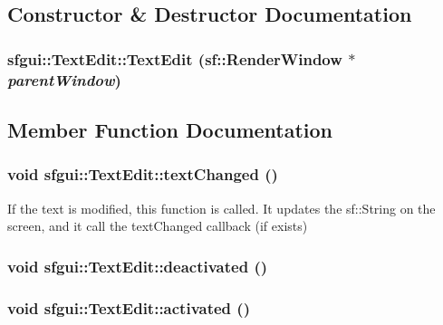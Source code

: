 \subsection{Constructor \& Destructor Documentation}
\hypertarget{classsfgui_1_1TextEdit_c6f2d938ccf876f05a9a9c47060c6093}{
\subsubsection[TextEdit]{\setlength{\rightskip}{0pt plus 5cm}sfgui::TextEdit::TextEdit (sf::RenderWindow $\ast$ {\em parentWindow})}}
\label{classsfgui_1_1TextEdit_c6f2d938ccf876f05a9a9c47060c6093}




\subsection{Member Function Documentation}
\hypertarget{classsfgui_1_1TextEdit_04bf790d96e0014479cc791691ecbade}{
\subsubsection[textChanged]{\setlength{\rightskip}{0pt plus 5cm}void sfgui::TextEdit::textChanged ()}}
\label{classsfgui_1_1TextEdit_04bf790d96e0014479cc791691ecbade}




If the text is modified, this function is called. It updates the sf::String on the screen, and it call the textChanged callback (if exists) \hypertarget{classsfgui_1_1TextEdit_c5ff761e3933294b46892db32e62b9f6}{
\subsubsection[deactivated]{\setlength{\rightskip}{0pt plus 5cm}void sfgui::TextEdit::deactivated ()}}
\label{classsfgui_1_1TextEdit_c5ff761e3933294b46892db32e62b9f6}


\hypertarget{classsfgui_1_1TextEdit_c009c601675801f2039d8f526e6fc921}{
\subsubsection[activated]{\setlength{\rightskip}{0pt plus 5cm}void sfgui::TextEdit::activated ()}}
\label{classsfgui_1_1TextEdit_c009c601675801f2039d8f526e6fc921}


